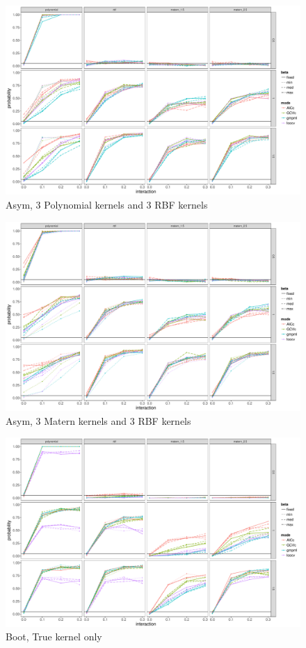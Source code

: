 \documentclass[11pt]{article}
\begin{document}
\begin{figure}
\begin{center}
\includegraphics[width=0.9\columnwidth]{exp_A4} 
\caption{Asym, 3 Polynomial kernels and 3 RBF kernels}
\label{fig:res}
\end{center}
\end{figure}

\begin{figure}
\begin{center}
\includegraphics[width=0.9\columnwidth]{exp_A5} 
\caption{Asym, 3 Matern kernels and 3 RBF kernels}
\label{fig:res}
\end{center}
\end{figure}

\begin{figure}
\begin{center}
\includegraphics[width=0.9\columnwidth]{exp_B1} 
\caption{Boot, True kernel only}
\label{fig:res}
\end{center}
\end{figure}
\end{document}
